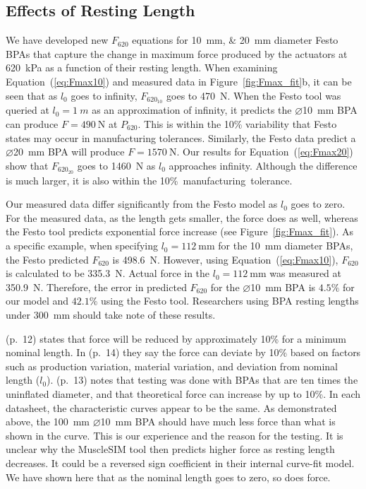 \subsection{Effects of Resting Length}\label{sec:disc_effects}
We have developed new $F_{620}$ equations for \qtylist{10;20}{\mm} diameter Festo BPAs that capture the change in maximum force produced by the actuators at  \qty{620}{\kPa} as a function of their resting length. When examining Equation~(\ref{eq:Fmax10}) and measured data in Figure~\ref{fig:Fmax_fit}b, it can be seen that as $l_0$ goes to infinity, $F_{620_{10}}$ goes to \qty{470}{\N}. When the Festo tool \citep{lang_robert_musclesim_2005} was queried at $l_0=\qty{1}{m}$ as an approximation of infinity, it predicts the $\diameter$\qty{10}{\mm} BPA can produce $F=\qty{490}{\N}$ at $P_{620}$. This is within the 10\% variability that Festo states may occur in manufacturing tolerances. Similarly, the Festo data predict a $\diameter$\qty{20}{\mm} BPA will produce $F=\qty{1570}{\N}$. Our results for Equation~(\ref{eq:Fmax20}) show that  $F_{620_{20}}$ goes to \qty{1460}{\N} as $l_0$ approaches infinity. Although the difference is much larger, it is also within the \mbox{10\% manufacturing tolerance. }

Our measured data differ significantly from the Festo model as $l_0$ goes to zero. For the measured data, as the length gets smaller, the force does as well, whereas the Festo tool predicts exponential force increase (see Figure~\ref{fig:Fmax_fit}). As a specific example, when specifying $l_0=\qty{112}{\mm}$ for the \qtylist{10}{\mm} diameter BPAs, the Festo predicted $F_{620}$ is \qtylist{498.6}{\N}. However, using Equation~(\ref{eq:Fmax10}), $F_{620}$ is calculated to be \qtylist{335.3}{\N}. Actual force in the $l_0=\qty{112}{\mm}$ was measured at \qtylist{350.9}{\N}. Therefore, the error in predicted $F_{620}$ for the $\diameter$\qty{10}{\mm} BPA is $4.5\%$ for our model and $42.1\%$ using the Festo tool. Researchers using BPA resting lengths under \qty{300}{\mm} should take note of these results.

\citet{festo_2026} (p.~12) states that force will be reduced by approximately 10\% for a minimum nominal length. In \citet{festo_2018} (p.~14) they say the force can deviate by 10\% based on factors such as production variation, material variation, and deviation from nominal length ($l_0$). \citet{festo_2013} (p.~13) notes that testing was done with BPAs that are ten times the uninflated diameter, and that theoretical force can increase by up to 10\%. In each datasheet, the characteristic curves appear to be the same. As demonstrated above, the \qty{100}{\mm} $\diameter$\qty{10}{\mm} BPA should have much less force than what is shown in the curve. This is our experience and the reason for the testing. It is unclear why the MuscleSIM tool \citep{lang_robert_musclesim_2005} then predicts higher force as resting length decreases. It could be a reversed sign coefficient in their internal curve-fit model. We have shown here that as the nominal length goes to zero, so does force. 

